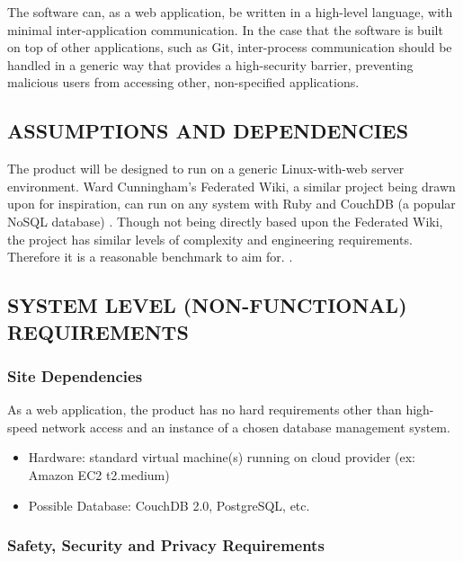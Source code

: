 \documentclass[onecolumn, draftclsnofoot,10pt, compsoc]{IEEEtran}
\begin{document}
\bigskip

{\noindent
The software can, as a web application, be written in a high-level language, with
minimal inter-application communication. In the case that the software is built
on top of other applications, such as Git, inter-process communication should be
handled in a generic way that provides a high-security barrier, preventing malicious
users from accessing other, non-specified applications.}

\subsection[ASSUMPTIONS AND DEPENDENCIES]{ASSUMPTIONS AND DEPENDENCIES}

{\noindent
The product will be designed to run on a generic Linux-with-web server environment.
Ward Cunningham's Federated Wiki, a similar project being drawn upon for inspiration, can run
on any system with Ruby and CouchDB (a popular NoSQL database) \cite{Federated}.
Though not being directly based upon the Federated Wiki, the project has similar
levels of complexity and engineering requirements. Therefore it is a reasonable
benchmark to aim for. \cite{Federated}.

\subsection[SYSTEM LEVEL (NON{}-FUNCTIONAL) REQUIREMENTS]{SYSTEM LEVEL (NON-FUNCTIONAL) REQUIREMENTS}


\subsubsection[Site Dependencies]{Site Dependencies}
As a web application, the product has no hard requirements other than high-speed
network access and an instance of a chosen database management system.
\begin{itemize}
  \item Hardware: standard virtual machine(s) running on cloud provider (ex: Amazon EC2
  t2.medium)
  \item Possible Database: CouchDB 2.0, PostgreSQL, etc.
\end{itemize}

\subsubsection[Safety, Security and Privacy Requirements]{Safety, Security and Privacy Requirements}

}
\end{document}
